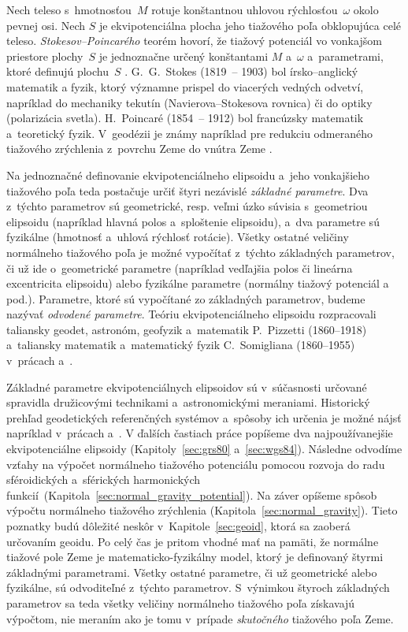 \documentclass[a4paper,12pt]{book}
\begin{document}
Nech teleso s~hmotnosťou~$M$ rotuje konštantnou uhlovou rýchlosťou~$\omega$ 
okolo pevnej osi.  Nech $S$ je ekvipotenciálna plocha jeho tiažového poľa 
obklopujúca celé teleso.  \emph{Stokesov--Poincarého} teorém hovorí, že tiažový 
potenciál vo vonkajšom priestore plochy~$S$ je jednoznačne určený konštantami 
$M$ a~$\omega$ a~parametrami, ktoré definujú plochu~$S$ 
\parencite{TorgeGeodesy}.  G.~G.~Stokes (1819~-- 1903) bol írsko--anglický 
matematik a fyzik, ktorý významne prispel do viacerých vedných odvetví, 
napríklad do mechaniky tekutín (Navierova--Stokesova rovnica) či do optiky 
(polarizácia svetla).  H.~Poincaré (1854~-- 1912) bol francúzsky matematik 
a~teoretický fyzik.  V~geodézii je známy napríklad pre redukciu odmeraného 
tiažového zrýchlenia z~povrchu Zeme do vnútra Zeme \parencite[Poincaré--Prey 
redukcia, pozri napríklad][]{MoritzPhysicalGeodesy}.

Na jednoznačné definovanie ekvipotenciálneho elipsoidu a~jeho vonkajšieho 
tiažového poľa teda postačuje určiť štyri nezávislé \emph{základné parametre}.  
Dva z~týchto parametrov sú geometrické, resp. veľmi úzko súvisia s~geometriou 
elipsoidu (napríklad hlavná polos a~sploštenie elipsoidu), a~dva parametre sú 
fyzikálne (hmotnosť a~uhlová rýchlosť rotácie).  Všetky ostatné veličiny 
normálneho tiažového poľa je možné vypočítať z~týchto základných parametrov, či 
už ide o~geometrické parametre (napríklad vedľajšia polos či lineárna 
excentricita elipsoidu) alebo fyzikálne parametre (normálny tiažový potenciál 
a pod.).  Parametre, ktoré sú vypočítané zo základných parametrov, budeme 
nazývať \emph{odvodené parametre}.  Teóriu ekvipotenciálneho elipsoidu 
rozpracovali taliansky geodet, astronóm, geofyzik a~matematik P.~Pizzetti 
(1860--1918) a~taliansky matematik a~matematický fyzik C.~Somigliana 
(1860--1955) v~prácach \textcite{Pizzetti1984} a~\textcite{Somigliana1929}.

Základné parametre ekvipotenciálnych elipsoidov sú v~súčasnosti určované 
spravidla družicovými technikami a~astronomickými meraniami.  Historický 
prehľad geodetických referenčných systémov a~spôsoby ich určenia je možné nájsť 
napríklad v~prácach \textcite{TorgeGeodesy} a~\textcite{MoritzPhysicalGeodesy}.  
V ďalších častiach práce popíšeme dva najpoužívanejšie ekvipotenciálne 
elipsoidy (Kapitoly~\ref{sec:grs80} a~\ref{sec:wgs84}).  Následne odvodíme 
vzťahy na výpočet normálneho tiažového potenciálu pomocou rozvoja do radu 
sféroidických a~sférických harmonických 
funkcií~(Kapitola~\ref{sec:normal_gravity_potential}).  Na záver opíšeme spôsob 
výpočtu normálneho tiažového zrýchlenia (Kapitola~\ref{sec:normal_gravity}).  
Tieto poznatky budú dôležité neskôr v~Kapitole~\ref{sec:geoid}, ktorá sa 
zaoberá určovaním geoidu.  Po celý čas je pritom vhodné mať na pamäti, že 
normálne tiažové pole Zeme je matematicko-fyzikálny model, ktorý je definovaný 
štyrmi základnými parametrami.  Všetky ostatné parametre, či už geometrické 
alebo fyzikálne, sú odvoditeľné z~týchto parametrov.  S~výnimkou štyroch 
základných parametrov sa teda všetky veličiny normálneho tiažového poľa 
získavajú výpočtom, nie meraním ako je tomu v~prípade \emph{skutočného} 
tiažového poľa Zeme.
\end{document}
